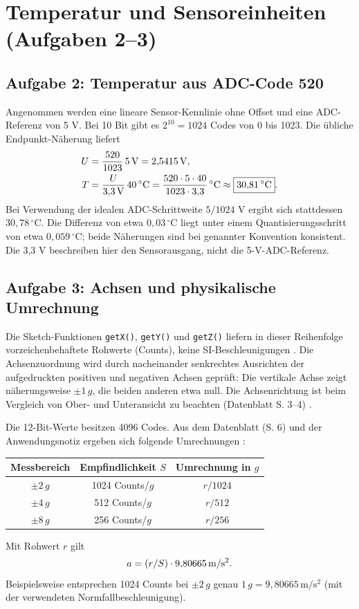 \documentclass[a4paper,oneside,10pt]{article}
\begin{document}
\section{Temperatur und Sensoreinheiten (Aufgaben 2--3)}
\subsection*{Aufgabe 2: Temperatur aus ADC-Code 520}
Angenommen werden eine lineare Sensor-Kennlinie ohne Offset und eine ADC-Referenz
von 5 V. Bei 10 Bit gibt es $2^{10}=1024$ Codes von 0 bis 1023.
Die übliche Endpunkt-Näherung liefert
\begin{align}
U &= \frac{520}{1023}\,5\,\mathrm{V}=2{,}5415\,\mathrm{V},\formeleintragalign{ADC-Code in Spannung umrechnen}\\
T &= \frac{U}{3{,}3\,\mathrm{V}}\,40\,{}^\circ\mathrm{C}
   =\frac{520\cdot5\cdot40}{1023\cdot3{,}3}\,{}^\circ\mathrm{C}
   \approx\boxed{30{,}81\,{}^\circ\mathrm{C}}.\formeleintragalign{Temperatur aus Sensorspannung}
\end{align}
Bei Verwendung der idealen ADC-Schrittweite $5/1024$ V ergibt sich stattdessen
$30{,}78\,{}^\circ$C. Die Differenz von etwa $0{,}03\,{}^\circ$C liegt unter
einem Quantisierungsschritt von etwa $0{,}059\,{}^\circ$C; beide Näherungen sind
bei genannter Konvention konsistent. Die 3,3 V beschreiben hier den
Sensorausgang, nicht die 5-V-ADC-Referenz.

\subsection*{Aufgabe 3: Achsen und physikalische Umrechnung}
Die Sketch-Funktionen \texttt{getX()}, \texttt{getY()} und \texttt{getZ()}
liefern in dieser Reihenfolge vorzeichenbehaftete Rohwerte (Counts), keine
SI-Beschleunigungen \cite{library}. Die Achsenzuordnung wird durch nacheinander
senkrechtes Ausrichten der aufgedruckten positiven und negativen Achsen geprüft:
Die vertikale Achse zeigt näherungsweise $\pm1\,g$, die beiden anderen etwa null.
Die Achsenrichtung ist beim Vergleich von Ober- und Unteransicht zu beachten
(Datenblatt S. 3--4) \cite{mma}.

Die 12-Bit-Werte besitzen 4096 Codes. Aus dem Datenblatt (S. 6) und der
Anwendungsnotiz ergeben sich folgende Umrechnungen \cite{mma,an4076}:
\begin{center}
\begin{tabular}{c|c|c}
Messbereich & Empfindlichkeit $S$ & Umrechnung in $g$\\\hline
$\pm2\,g$ & 1024 Counts/$g$ & $r/1024$\\
$\pm4\,g$ & 512 Counts/$g$ & $r/512$\\
$\pm8\,g$ & 256 Counts/$g$ & $r/256$
\end{tabular}\end{center}
Mit Rohwert $r$ gilt
\begin{equation}
a=(r/S)\cdot9{,}80665\,\mathrm{m/s^2}.
\formeleintrag{Rohwert in Beschleunigung umrechnen}
\end{equation}
Beispielsweise entsprechen 1024 Counts bei $\pm2\,g$ genau
$1\,g=9{,}80665\,\mathrm{m/s^2}$ (mit der verwendeten Normfallbeschleunigung).
\end{document}
